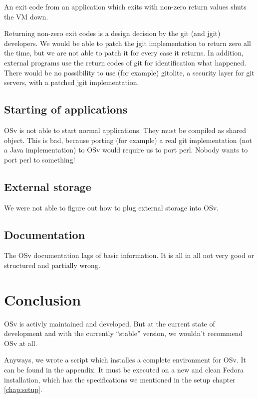         An exit code from an application which exits with non-zero return values
        shuts the VM down.

        Returning non-zero exit codes is a design decision by the git (and jgit)
        developers. We would be
        able to patch the jgit implementation to return zero all the time, but
        we are not able to patch it for every case it returns. In addition,
        external programs use the return codes of git for identification what
        happened. There would be no possibility to use (for example) gitolite, a
        security layer for git servers, with a patched jgit implementation.

    \section{Starting of applications}

        OSv is not able to start normal applications. They must be compiled as
        shared object. This is bad, because porting (for example) a real git
        implementation (not a Java implementation) to OSv would require us to
        port perl. Nobody wants to port perl to something!

    \section{External storage}

        We were not able to figure out how to plug external storage into OSv.

    \section{Documentation}

        The OSv documentation lags of basic information. It is all in all not
        very good or structured and partially wrong.

\chapter{Conclusion}

    OSv is activly maintained and developed. But at the current state of
    development and with the currently ``stable'' version, we wouldn't recommend
    OSv at all.

    Anyways, we wrote a script which installes a complete environment for OSv.
    It can be found in the appendix. It must be executed on a new and clean
    Fedora installation, which has the specifications we mentioned in the setup
    chapter \ref{chap:setup}.
